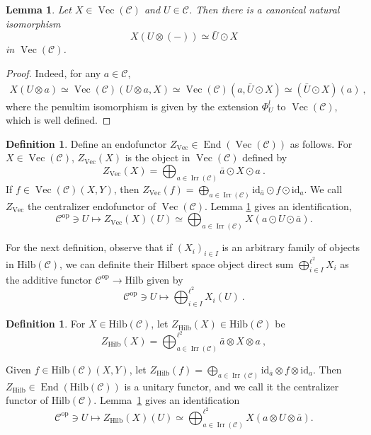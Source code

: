 \documentclass[a4paper,11pt,reqno]{amsart}
\numberwithin{equation}{section}
\newtheorem{lemma}[theorem]{Lemma}
\theoremstyle{remark}
\theoremstyle{definition}
\newtheorem{definition}[theorem]{Definition}
\newcommand{\cC}{\mathcal C}
\DeclareMathOperator{\End}{End}
\DeclareMathOperator{\Irr}{Irr}
\DeclareMathOperator{\Vect}{Vec}
\newcommand\op{\text{op}}
\newcommand{\id}{\mathrm{id}}
\newcommand{\Hilb}{\mathrm{Hilb}}
\begin{document}
\begin{lemma}\label{lemma:shiftedind-objects}
	Let $X \in \Vect(\cC)$  and $U \in \cC$. Then there is a canonical natural isomorphism
	\[ 
	X(U \otimes  (-)) \simeq \bar{U} \odot X 
	\]
	in $\Vect(\cC)$.
\end{lemma}
\begin{proof}
	Indeed, for any $a \in \cC$,
	\begin{align*}
		X(U \otimes a) \simeq \Vect(\cC)(U \otimes a,X) \simeq \Vect(\cC) (a, \bar{U} \odot X) \simeq (\bar{U}  \odot X)(a) \ ,
	\end{align*}
	where the penultim isomorphism is given by the extension $\Phi^l_U$ to $\Vect(\cC)$, which is well defined.
\end{proof}

\begin{definition}
	Define an endofunctor $Z_{\Vect} \in \End(\Vect(\cC))$ as follows. For $X \in \Vect(\cC)$, $Z_{\Vect}(X)$ is the object in $\Vect(\cC)$ defined by
	\[
	Z_{\Vect}(X) = \bigoplus_{a \in \Irr(\cC)} \bar{a} \odot X \odot a \ .
	\]
	If $f \in \Vect(\cC)(X,Y)$, then $Z_{\Vect}(f) = \bigoplus_{a \in \Irr(\cC)} \id_{\bar{a}} \odot f \odot \id_{{a}}$. We call $Z_{\Vect}$ the centralizer endofunctor of $\Vect(\cC)$.
	Lemma \ref{lemma:shiftedind-objects} gives an identification, 
	\[
	\cC^{\op} \ni U \mapsto Z_{\Vect}(X)(U) \simeq \bigoplus_{a \in \Irr(\cC)} X(a \odot U \odot \bar{a}) .
	\]
	\label{def:algebraiccentralizer}
\end{definition}

For the next definition, observe that if $(X_i)_{i \in I}$ is an arbitrary family of objects in $\Hilb(\cC)$, we can definite their Hilbert space object direct sum $\bigoplus_{i \in I}^{\ell^2} X_i$ as the additive functor $\cC^{\op} \to \Hilb$ given by
\[
\cC^{\op} \ni U \mapsto \bigoplus_{i \in I}^{\ell^2} X_i(U) \ .
\]

\begin{definition}
	For $X \in \Hilb(\cC)$, let $Z_{\Hilb}(X) \in \Hilb(\cC)$ be 
	\[
	Z_{\Hilb}(X) = \bigoplus_{a \in \Irr(\cC)}^{\ell^2} \bar{a} \otimes X \otimes a \ ,
	\]
	
	Given $f \in \Hilb(\cC)(X,Y)$, let $Z_{\Hilb}(f) = \bigoplus_{a \in \Irr(\cC)} \id_{\bar{a}} \otimes f \otimes \id_{a}$. Then $Z_{\Hilb} \in \End(\Hilb(\cC))$ is a unitary functor, and we call it the centralizer functor of $\Hilb(\cC)$. Lemma~\ref{lemma:shiftedind-objects} gives an identification
	\[
	\cC^{\op} \ni U \mapsto Z_{\Hilb}(X)(U) \simeq \bigoplus_{a \in \Irr(\cC)}^{\ell^2} X(a\otimes U \otimes \bar{a})  . 
	\]
	\label{def:unitarycentralizer}
\end{definition}
\end{document}
